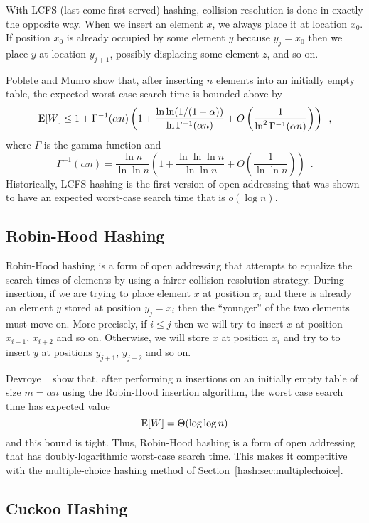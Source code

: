 With LCFS (last-come first-served) hashing, collision resolution is
done in exactly the opposite way.  When we insert an element $x$, we
always place it at location $x_0$.  If position $x_0$ is already
occupied by some element $y$ because $y_j=x_0$ then we place $y$ at
location $y_{j+1}$, possibly displacing some element $z$, and so on.

Poblete and Munro \cite{pm89} show that, after inserting $n$ elements
into an initially empty table, the expected worst case search time is
bounded above by
\[  \mathrm{E}[W] \le 
   1 
   + \Gamma^{-1}(\alpha n)
   \left( 1+\frac{\ln\ln(1/(1-\alpha))}{\ln \Gamma^{-1}(\alpha n)}
   + O\left(\frac{1}{\ln^2\Gamma^{-1}(\alpha n)} \right)\right)
\enspace ,
\]
where $\Gamma$ is the gamma function and 
\[
  \Gamma^{-1}(\alpha n) = \frac{\ln n}{\ln\ln n}
	\left(1+\frac{\ln\ln\ln n}{\ln\ln n} + 
	O\left(\frac{1}{\ln\ln n}\right)\right) \enspace .
\]
Historically, LCFS hashing is the first version of open addressing
that was shown to have an expected worst-case search time that is
$o(\log n)$.

\subsection{Robin-Hood Hashing}
\label{hash:sec:robinhood}

Robin-Hood hashing \cite{c86,clm85,vp98} is a form of open addressing
that attempts to equalize the search times of elements by using a
fairer collision resolution strategy.  During insertion, if we are
trying to place element $x$ at position $x_i$ and there is already an
element $y$ stored at position $y_j=x_i$ then the ``younger'' of the
two elements must move on.  More precisely, if $i\le j$ then we will
try to insert $x$ at position $x_{i+1}$, $x_{i+2}$ and so on.
Otherwise, we will store $x$ at position $x_i$ and try to to insert
$y$ at positions $y_{j+1}$, $y_{j+2}$ and so on.

Devroye \etal\ \cite{dmv03} show that, after performing $n$ insertions on
an initially empty table of size $m=\alpha n$ using the Robin-Hood
insertion algorithm, the worst case search time has expected value
\[
	\mathrm{E}[W] = \Theta(\log\log n)
\]
and this bound is tight.
Thus, Robin-Hood hashing is a form of open addressing that
has doubly-logarithmic worst-case search time.  This makes it
competitive with the multiple-choice hashing method of
Section~\ref{hash:sec:multiplechoice}.

\subsection{Cuckoo Hashing}\label{hash:sec:cuckoo}

